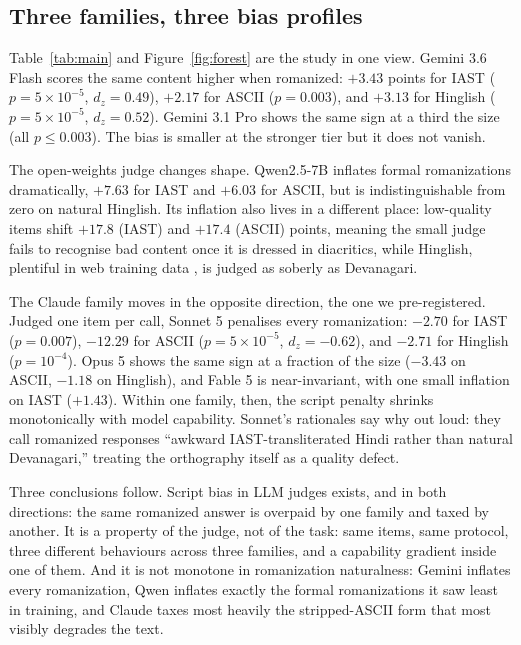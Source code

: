 \documentclass[10pt,twocolumn]{article}
\begin{document}
\subsection{Three families, three bias profiles}

Table~\ref{tab:main} and Figure~\ref{fig:forest} are the study in one view. Gemini 3.6 Flash scores the same content higher when romanized: $+3.43$ points for IAST ($p = 5 \times 10^{-5}$, $d_z = 0.49$), $+2.17$ for ASCII ($p = 0.003$), and $+3.13$ for Hinglish ($p = 5 \times 10^{-5}$, $d_z = 0.52$). Gemini 3.1 Pro shows the same sign at a third the size (all $p \le 0.003$). The bias is smaller at the stronger tier but it does not vanish.

The open-weights judge changes shape. Qwen2.5-7B inflates formal romanizations dramatically, $+7.63$ for IAST and $+6.03$ for ASCII, but is indistinguishable from zero on natural Hinglish. Its inflation also lives in a different place: low-quality items shift $+17.8$ (IAST) and $+17.4$ (ASCII) points, meaning the small judge fails to recognise bad content once it is dressed in diacritics, while Hinglish, plentiful in web training data \citep{sheth2025comilingua}, is judged as soberly as Devanagari.

The Claude family moves in the opposite direction, the one we pre-registered. Judged one item per call, Sonnet 5 penalises every romanization: $-2.70$ for IAST ($p = 0.007$), $-12.29$ for ASCII ($p = 5 \times 10^{-5}$, $d_z = -0.62$), and $-2.71$ for Hinglish ($p = 10^{-4}$). Opus 5 shows the same sign at a fraction of the size ($-3.43$ on ASCII, $-1.18$ on Hinglish), and Fable 5 is near-invariant, with one small inflation on IAST ($+1.43$). Within one family, then, the script penalty shrinks monotonically with model capability. Sonnet's rationales say why out loud: they call romanized responses ``awkward IAST-transliterated Hindi rather than natural Devanagari,'' treating the orthography itself as a quality defect.

Three conclusions follow. Script bias in LLM judges exists, and in both directions: the same romanized answer is overpaid by one family and taxed by another. It is a property of the judge, not of the task: same items, same protocol, three different behaviours across three families, and a capability gradient inside one of them. And it is not monotone in romanization naturalness: Gemini inflates every romanization, Qwen inflates exactly the formal romanizations it saw least in training, and Claude taxes most heavily the stripped-ASCII form that most visibly degrades the text.
\end{document}
